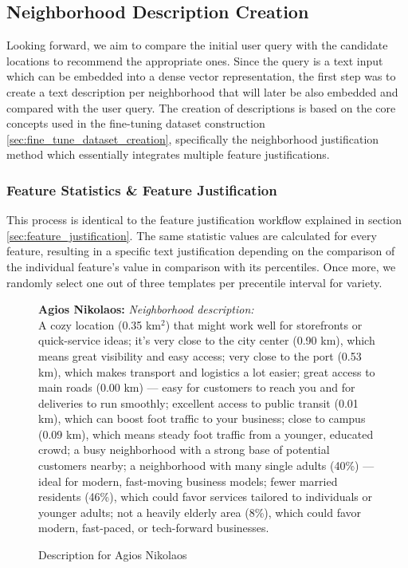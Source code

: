 \subsection{Neighborhood Description Creation}
\label{sec:neigh_desc}

Looking forward, we aim to compare the initial user query with the candidate locations to recommend the appropriate ones. Since the query is a text input which can be embedded into a dense vector representation, the first step was to create a text description per neighborhood that will later be also embedded and compared with the user query. The creation of descriptions is based on the core concepts used in the fine-tuning dataset construction \ref{sec:fine_tune_dataset_creation}, specifically the neighborhood justification method which essentially integrates multiple feature justifications.


\subsubsection{Feature Statistics \& Feature Justification}

This process is identical to the feature justification workflow explained in section \ref{sec:feature_justification}. The same statistic values are calculated for every feature, resulting in a specific text justification depending on the comparison of the individual feature's value in comparison with its percentiles. Once more, we randomly select one out of three templates per precentile interval for variety.



\begin{figure}[htbp]
  \centering
  \begin{tcolorbox}[myexample, title={Neighborhood Description}]
  \vspace{0.5\baselineskip}
  \textbf{Agios Nikolaos:} \emph{Neighborhood description:\\}
    A cozy location (0.35 km$^{2}$) that might work well for storefronts or quick-service ideas; it's very close to the city center (0.90 km), which means great visibility and easy access; very close to the port (0.53 km), which makes transport and logistics a lot easier; great access to main roads (0.00 km) — easy for customers to reach you and for deliveries to run smoothly; excellent access to public transit (0.01 km), which can boost foot traffic to your business; close to campus (0.09 km), which means steady foot traffic from a younger, educated crowd; a busy neighborhood with a strong base of potential customers nearby; a neighborhood with many single adults (40\%) — ideal for modern, fast-moving business models; fewer married residents (46\%), which could favor services tailored to individuals or younger adults; not a heavily elderly area (8\%), which could favor modern, fast-paced, or tech-forward businesses.
  \end{tcolorbox}
  \caption{Description for Agios Nikolaos}
  \label{fig:description_agiosnikolaos}
\end{figure}

